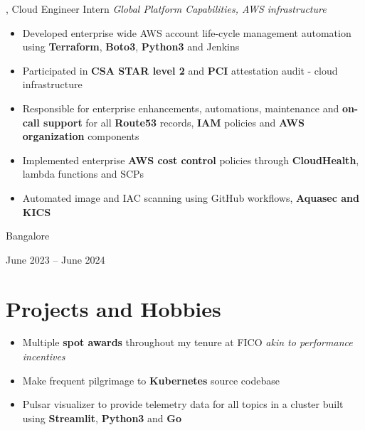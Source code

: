 \documentclass[10pt, letterpaper]{article}
\newenvironment{highlights}{
    \begin{itemize}[
        topsep=0.10 cm,
        parsep=0.10 cm,
        partopsep=0pt,
        itemsep=0pt,
        leftmargin=0.4 cm + 10pt
    ]
}{
    \end{itemize}
} %
\newenvironment{twocolentry}[2][]{
    \onecolentry
    \def\secondColumn{#2}
    \setcolumnwidth{\fill, 4.5 cm}
    \begin{paracol}{2}
}{
    \switchcolumn \raggedleft \secondColumn
    \end{paracol}
    \endonecolentry
} %
\let\hrefWithoutArrow\href
\renewcommand{\href}[2]{\hrefWithoutArrow{#1}{\ifthenelse{\equal{#2}{}}{ }{#2 }\raisebox{.15ex}{\footnotesize \faExternalLink*}}}
\begin{document}
        \begin{twocolentry}{
            Bangalore
            
        June 2023 – June 2024
        }
            \href{https://www.fico.com/en}{\textbf{FICO}}, Cloud Engineer Intern\newline
            \textit{Global Platform Capabilities, AWS infrastructure}
            \begin{highlights}
                \item Developed enterprise wide AWS account life-cycle management automation using \textbf{Terraform}, \textbf{Boto3}, \textbf{Python3} and Jenkins
                \item Participated in \textbf{CSA STAR level 2} and \textbf{PCI} attestation audit - cloud infrastructure
                \item Responsible for enterprise enhancements, automations, maintenance and \textbf{on-call support} for all \textbf{Route53} records, \textbf{IAM} policies and \textbf{AWS organization} components
                \item Implemented enterprise \textbf{AWS cost control} policies through \textbf{CloudHealth}, lambda functions and SCPs
                \item Automated image and IAC scanning using GitHub workflows, \textbf{Aquasec and KICS}
            \end{highlights}
        \end{twocolentry}
    
    \section{Projects and Hobbies}
        \begin{highlights}
            \item Multiple \textbf{spot awards} throughout my tenure at FICO \textit{akin to performance incentives}
            \item Make frequent pilgrimage to \textbf{Kubernetes} source codebase
            \item Pulsar visualizer to provide telemetry data for all topics in a cluster built using \textbf{Streamlit}, \textbf{Python3} and \textbf{Go}            
        \end{highlights}

        
\end{document}
